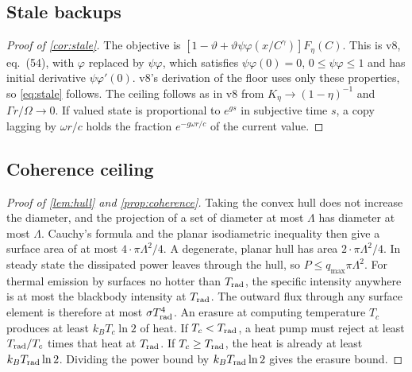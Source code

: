 \documentclass[11pt,a4paper]{article}
\theoremstyle{definition}
\begin{document}
\subsection{Stale backups}
\label{app:stale-proof}
\begin{proof}[Proof of \cref{cor:stale}]
The objective is $[1-\vartheta+\vartheta\psi\varphi(x/C^\gamma)]F_\eta(C)$.
This is v8, eq.~(54), with $\varphi$ replaced by $\psi\varphi$, which
satisfies $\psi\varphi(0)=0$, $0\leq\psi\varphi\leq1$ and has initial derivative
$\psi\varphi'(0)$. v8's derivation of the floor uses only these properties, so
\cref{eq:stale} follows. The ceiling follows as in v8 from
$K_\eta\to(1-\eta)^{-1}$ and $\Gamma r/\Omega\to0$. If valued state is
proportional to $e^{gs}$ in subjective time $s$, a copy lagging by $\omega r/c$
holds the fraction $e^{-g\omega r/c}$ of the current value.
\end{proof}

\subsection{Coherence ceiling}
\label{app:coherence-proof}
\begin{proof}[Proof of \cref{lem:hull} and \cref{prop:coherence}]
Taking the convex hull does not increase the diameter, and the projection
of a set of diameter at most $\Lambda$ has diameter at most $\Lambda$. Cauchy's
formula and the planar isodiametric inequality then give a surface area of at
most $4\cdot\pi\Lambda^2/4$. A degenerate, planar hull has area
$2\cdot\pi\Lambda^2/4$. In steady state the dissipated power leaves through the
hull, so $P\leq q_{\max}\pi\Lambda^2$. For thermal emission by surfaces no hotter
than $T_{\rm rad}$, the specific intensity anywhere is at most the blackbody
intensity at $T_{\rm rad}$. The outward flux through any surface element is
therefore at most $\sigma T_{\rm rad}^4$. An erasure at computing temperature
$T_c$ produces at least $k_BT_c\ln2$ of heat. If $T_c<T_{\rm rad}$, a heat pump
must reject at least $T_{\rm rad}/T_c$ times that heat at $T_{\rm rad}$. If
$T_c\geq T_{\rm rad}$, the heat is already at least $k_BT_{\rm rad}\ln2$. Dividing
the power bound by $k_BT_{\rm rad}\ln2$ gives the erasure bound.
\end{proof}
\end{document}
